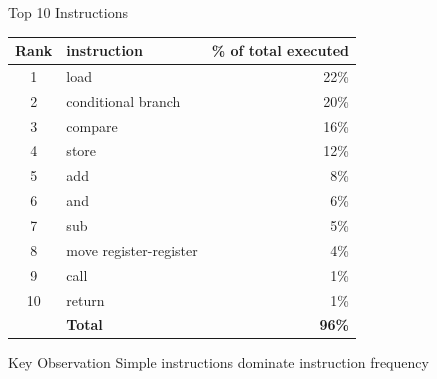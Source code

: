 \documentclass[aspectratio=169,12pt]{beamer}
\begin{document}
\begin{frame}{Top 10 Instructions}
\centering
\begin{table}
\begin{tabular}{clr}
\toprule
\textbf{Rank} & \textbf{instruction} & \textbf{\% of total executed} \\
\midrule
1 & load & 22\% \\
2 & conditional branch & 20\% \\
3 & compare & 16\% \\
4 & store & 12\% \\
5 & add & 8\% \\
6 & and & 6\% \\
7 & sub & 5\% \\
8 & move register-register & 4\% \\
9 & call & 1\% \\
10 & return & 1\% \\
\midrule
& \textbf{Total} & \textbf{96\%} \\
\bottomrule
\end{tabular}
\end{table}

\vspace{0.5cm}
\begin{alertblock}{Key Observation}
\centering
Simple instructions dominate instruction frequency
\end{alertblock}
\end{frame}
\end{document}
